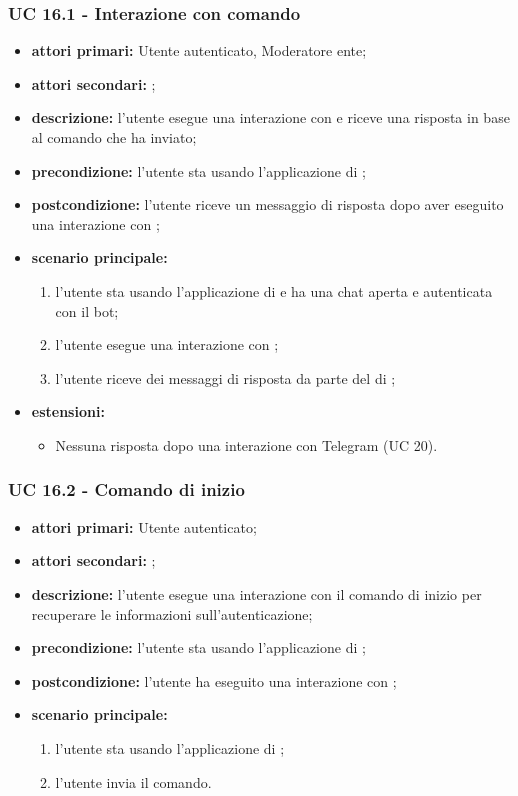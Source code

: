 	\subsubsection{UC 16.1 - Interazione con comando}

	\begin{itemize}
		\item \textbf{attori primari:} Utente autenticato, Moderatore ente;
		\item \textbf{attori secondari:} ;
		\item \textbf{descrizione:} l'utente esegue una interazione con  e riceve una risposta in base al comando che ha inviato;
		\item \textbf{precondizione:} l'utente sta usando l'applicazione di ;
		\item \textbf{postcondizione:} l'utente riceve un messaggio di risposta dopo aver eseguito una interazione con ;
		\item \textbf{scenario principale:}
		\begin{enumerate}
			\item l'utente sta usando l'applicazione di  e ha una chat aperta e autenticata con il bot; 
			\item l'utente esegue una interazione con ;
			\item l'utente riceve dei messaggi di risposta da parte del  di ;
		\end{enumerate}
		\item \textbf{estensioni:}
		\begin{itemize}
			\item Nessuna risposta dopo una interazione con Telegram (UC 20).
		\end{itemize}
	\end{itemize}

	\subsubsection{UC 16.2 - Comando di inizio}

	\begin{itemize}
		\item \textbf{attori primari:} Utente autenticato;
		\item \textbf{attori secondari:} ;
		\item \textbf{descrizione:} l'utente esegue una interazione con il comando di inizio per recuperare le informazioni sull'autenticazione;
		\item \textbf{precondizione:} l'utente sta usando l'applicazione di ;
		\item \textbf{postcondizione:} l'utente ha eseguito una interazione con ;
		\item \textbf{scenario principale:}
		\begin{enumerate}
			\item l'utente sta usando l'applicazione di ;
			\item l'utente invia il comando.
		\end{enumerate}
	\end{itemize}


